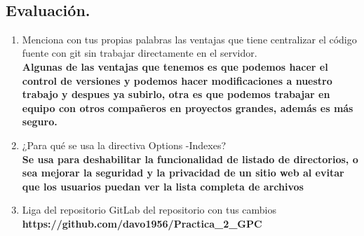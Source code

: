 \documentclass[12pt]{article}
\begin{document}
\begin{enumerate}
\end{enumerate}\\


{\color{blue} \subsection*{\textbf{Evaluación.}}}
\vspace{1em}
\begin{enumerate}
    \item Menciona con tus propias palabras las ventajas que tiene centralizar el código fuente con git sin trabajar directamente en el servidor.\\
    \textbf{Algunas de las ventajas que tenemos es que podemos hacer el control de versiones y podemos hacer modificaciones a nuestro trabajo y despues ya subirlo, otra es que podemos trabajar en equipo con otros compañeros en proyectos grandes, además es más seguro.}\\
    
    \item ¿Para qué se usa la directiva Options -Indexes?\\
    \textbf{Se usa para deshabilitar la funcionalidad de listado de directorios, o sea mejorar la seguridad y la privacidad de un sitio web al evitar que los usuarios puedan ver la lista completa de archivos}\\
    
    \item Liga del repositorio GitLab del repositorio con tus cambios\\
    \textbf{https://github.com/davo1956/Practica_2_GPC}


\end{enumerate}
\end{document}
